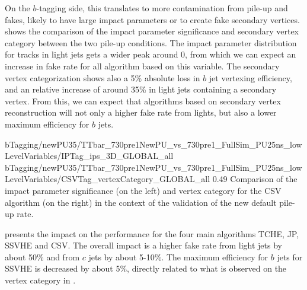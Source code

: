 
        On the $b$-tagging side, this translates to more contamination from pile-up and
        fakes, likely to have large impact parameters or to create fake secondary vertices.
         shows the comparison of the impact
        parameter significance and secondary vertex category between the two pile-up conditions.
        The impact parameter distribution for tracks in light jets gets a wider peak around
        0, from which we can expect an increase in fake rate for all algorithm based on
        this variable. The secondary vertex categorization shows also a 5\% absolute loss
        in $b$ jet vertexing efficiency, and an relative increase of around 35\% in light
        jets containing a secondary vertex. From this, we can expect that algorithms based
        on secondary vertex reconstruction will not only a higher fake rate from lights,
        but also a lower maximum efficiency for $b$ jets.

                         {bTagging/newPU35/TTbar_730pre1NewPU_vs_730pre1_FullSim_PU25ns_lowLevelVariables/IPTag_ips_3D_GLOBAL_all}
                         {bTagging/newPU35/TTbar_730pre1NewPU_vs_730pre1_FullSim_PU25ns_lowLevelVariables/CSVTag_vertexCategory_GLOBAL_all}
                         {0.49}
                         {Comparison of the impact parameter significance (on the left)
                         and vertex category for the CSV algorithm (on the right) in the
                         context of the validation of the new default pile-up rate.}

         presents the impact on the performance
        for the four main algorithms TCHE, JP, SSVHE and CSV. The overall impact is a higher
        fake rate from light jets by about 50\% and from $c$ jets by about 5-10\%. The
        maximum efficiency for $b$ jets for SSVHE is decreased by about 5\%, directly
        related to what is observed on the vertex category in .

